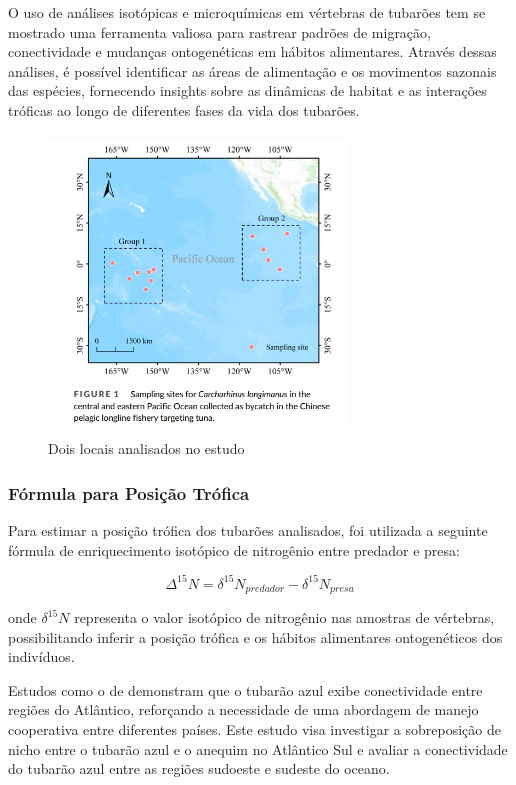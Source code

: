 \documentclass[utf8]{FrontiersinHarvard}
\begin{document}
O uso de análises isotópicas e microquímicas em vértebras de tubarões
tem se mostrado uma ferramenta valiosa para rastrear padrões de
migração, conectividade e mudanças ontogenéticas em hábitos alimentares.
Através dessas análises, é possível identificar as áreas de alimentação
e os movimentos sazonais das espécies, fornecendo insights sobre as
dinâmicas de habitat e as interações tróficas ao longo de diferentes
fases da vida dos tubarões.

\begin{figure}
\centering
\includegraphics[width=3.125in,height=3.125in]{stockarea.jpg}
\caption{Dois locais analisados no estudo}
\end{figure}

\subsubsection*{Fórmula para Posição
Trófica}\label{fuxf3rmula-para-posiuxe7uxe3o-truxf3fica}

Para estimar a posição trófica dos tubarões analisados, foi utilizada a
seguinte fórmula de enriquecimento isotópico de nitrogênio entre
predador e presa:

\[
\Delta^{15}N = \delta^{15}N_{predador} - \delta^{15}N_{presa}
\]

onde \(\delta^{15}N\) representa o valor isotópico de nitrogênio nas
amostras de vértebras, possibilitando inferir a posição trófica e os
hábitos alimentares ontogenéticos dos indivíduos.

Estudos como o de demonstram que o tubarão azul exibe conectividade
entre regiões do Atlântico, reforçando a necessidade de uma abordagem de
manejo cooperativa entre diferentes países. Este estudo visa investigar
a sobreposição de nicho entre o tubarão azul e o anequim no Atlântico
Sul e avaliar a conectividade do tubarão azul entre as regiões sudoeste
e sudeste do oceano.
\end{document}
